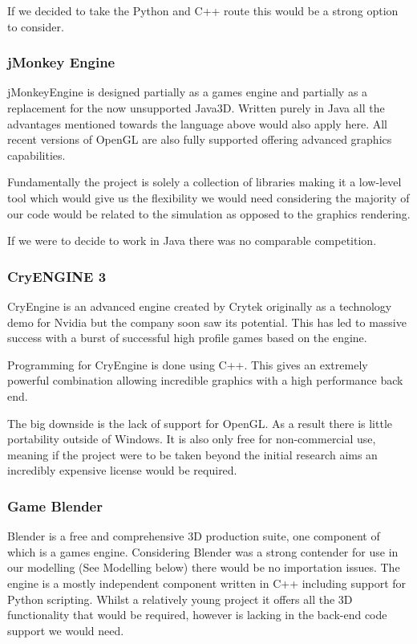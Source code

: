 If we decided to take the Python and C++ route this would be a strong
option to consider.


\subsubsection{jMonkey Engine}

jMonkeyEngine is designed partially as a games engine and partially as a
replacement for the now unsupported Java3D. Written purely in Java
all the advantages mentioned towards the language above would also
apply here. All recent versions of OpenGL are also fully supported
offering advanced graphics capabilities.

Fundamentally the project is solely a collection of libraries making
it a low-level tool which would give us the flexibility we would need
considering the majority of our code would be related to the simulation
as opposed to the graphics rendering.

If we were to decide to work in Java there was no comparable competition.


\subsubsection{CryENGINE 3}

CryEngine is an advanced engine created by Crytek originally as a
technology demo for Nvidia but the company soon saw its potential.
This has led to massive success with a burst of successful high profile
games based on the engine.

Programming for CryEngine is done using C++. This gives an extremely
powerful combination allowing incredible graphics with a high performance
back end.

The big downside is the lack of support for OpenGL. As a result there
is little portability outside of Windows. It is also only free for
non-commercial use, meaning if the project were to be taken beyond
the initial research aims an incredibly expensive license would be
required.


\subsubsection{Game Blender}

Blender is a free and comprehensive 3D production suite, one component
of which is a games engine. Considering Blender was a strong contender
for use in our modelling (See Modelling below) there would be no importation
issues. The engine is a mostly independent component written in C++
including support for Python scripting. Whilst a relatively young
project it offers all the 3D functionality that would be required,
however is lacking in the back-end code support we would need.


